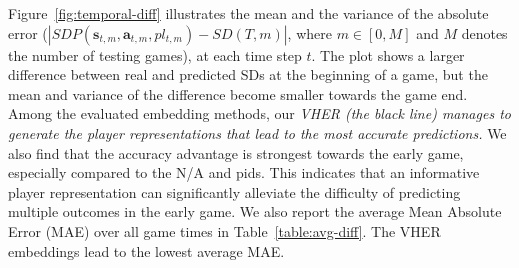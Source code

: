 \documentclass{article}
\newcommand{\scorediff}{SD}
\newcommand{\state}{\mathbf{s}}
\newcommand{\action}{\mathbf{a}}
\newcommand{\player}{pl}
\begin{document}
Figure~\ref{fig:temporal-diff} illustrates the mean and the variance of the absolute error ($ |SDP(\state_{t,m},\action_{t,m}, \player_{t,m})-\scorediff(T,m)|$, where $m\in[0, M]$ and $M$ denotes the number of testing games), at each time step $t$. The plot shows a larger difference between real and predicted SDs at the beginning of a game, but the mean and variance of the difference become smaller towards the game end. Among the evaluated embedding methods, our {\em VHER (the black line) manages to generate the player representations that lead to the most accurate predictions.} We also find that the accuracy advantage is strongest towards the early game, especially compared to the N/A and pids. This indicates that an informative player representation can significantly alleviate the difficulty of predicting multiple outcomes in the early game. We also report the average Mean Absolute Error (MAE) over all game times in Table~\ref{table:avg-diff}. The VHER embeddings lead to the lowest average MAE. 
\vspace{-0.3in}
\end{document}

